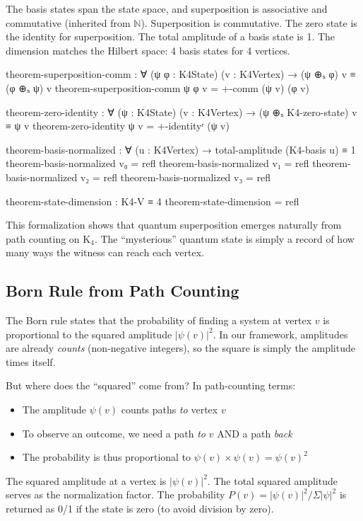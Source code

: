 \documentclass[11pt,a4paper]{book}
\begin{document}
The basis states span the state space, and superposition is associative
and commutative (inherited from $\mathbb{N}$). Superposition is commutative. The zero state is the identity for superposition. The total amplitude of a basis state is 1. The dimension matches the Hilbert space: 4 basis states for 4 vertices.

\begin{code}
theorem-superposition-comm : ∀ (ψ φ : K4State) (v : K4Vertex) →
  (ψ ⊕ₛ φ) v ≡ (φ ⊕ₛ ψ) v
theorem-superposition-comm ψ φ v = +-comm (ψ v) (φ v)

theorem-zero-identity : ∀ (ψ : K4State) (v : K4Vertex) →
  (ψ ⊕ₛ K4-zero-state) v ≡ ψ v
theorem-zero-identity ψ v = +-identityʳ (ψ v)

theorem-basis-normalized : ∀ (u : K4Vertex) → 
  total-amplitude (K4-basis u) ≡ 1
theorem-basis-normalized v₀ = refl
theorem-basis-normalized v₁ = refl
theorem-basis-normalized v₂ = refl
theorem-basis-normalized v₃ = refl

theorem-state-dimension : K4-V ≡ 4
theorem-state-dimension = refl
\end{code}

This formalization shows that quantum superposition emerges naturally from 
path counting on K$_4$. The ``mysterious'' quantum state is simply a record 
of how many ways the witness can reach each vertex.

\subsection{Born Rule from Path Counting}

The Born rule states that the probability of finding a system at vertex $v$ 
is proportional to the squared amplitude $|\psi(v)|^2$. In our framework,
amplitudes are already \emph{counts} (non-negative integers), so the square
is simply the amplitude times itself.

But where does the ``squared'' come from? In path-counting terms:
\begin{itemize}
\item The amplitude $\psi(v)$ counts paths \emph{to} vertex $v$
\item To observe an outcome, we need a path \emph{to} $v$ AND a path \emph{back}
\item The probability is thus proportional to $\psi(v) \times \psi(v) = \psi(v)^2$
\end{itemize}

The squared amplitude at a vertex is $|\psi(v)|^2$. The total squared amplitude serves as the normalization factor. The probability $P(v) = |\psi(v)|^2 / \Sigma|\psi|^2$ is returned as 0/1 if the state is zero (to avoid division by zero).
\end{document}
